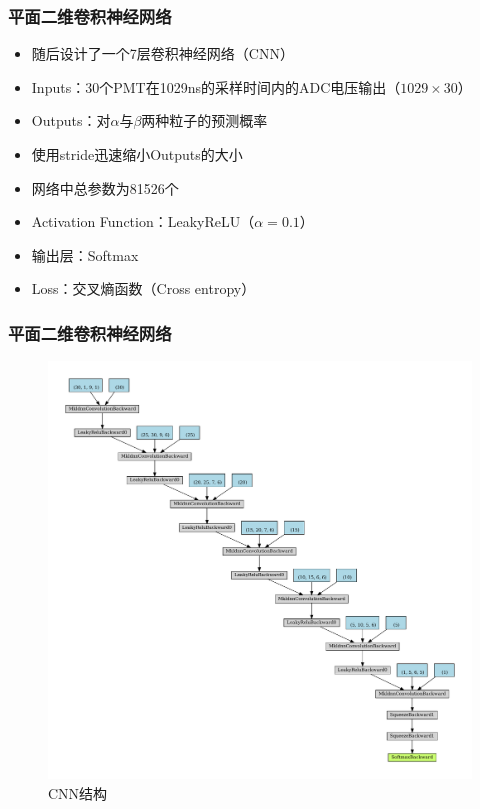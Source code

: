 \documentclass{beamer}
\begin{document}
\begin{frame}
\frametitle{平面二维卷积神经网络}
\begin{itemize}
    \item <1-> 随后设计了一个7层卷积神经网络（CNN）
    \item <2-> Inputs：30个PMT在1029ns的采样时间内的ADC电压输出（$1029\times30$）
    \item <3-> Outputs：对$\alpha$与$\beta$两种粒子的预测概率
    \item <4-> 使用stride迅速缩小Outputs的大小
    \item <5-> 网络中总参数为81526个
    \item <6-> Activation Function：LeakyReLU（$\alpha=0.1$）
    \item <7-> 输出层：Softmax
    \item <7-> Loss：交叉熵函数（Cross entropy）
\end{itemize}
\end{frame}

\begin{frame}
\frametitle{平面二维卷积神经网络}
\begin{figure}[H]
    \centering
    \includegraphics[width=0.6\linewidth]{net.pdf}
    \caption{CNN结构}
\end{figure}
\end{frame}
\end{document}
